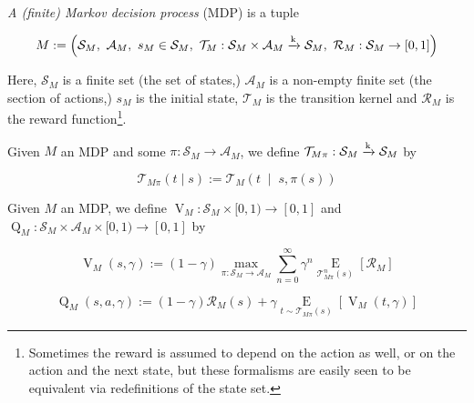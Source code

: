\documentclass[anon,12pt]{colt2018} %
\newcommand{\Comment}[1]{}
\newcommand{\AP}[1]{\left(#1\right)}
\newcommand{\AB}[1]{\left[#1\right]}
\newcommand{\APM}[2]{\left(#1\;\middle\vert\;#2\right)}
\newcommand{\Ea}[2]{\underset{#1}{\operatorname{E}}\AB{#2}}
\newcommand{\K}{\xrightarrow{\textnormal{k}}}
\newcommand{\A}{\mathcal{A}}
\newcommand{\St}{\mathcal{S}}
\newcommand{\T}{\mathcal{T}}
\newcommand{\R}{\mathcal{R}}
\newcommand{\V}{\operatorname{V}}
\newcommand{\Q}{\operatorname{Q}}
\begin{document}
\begin{samepage}
\begin{definition}

\emph{A (finite) Markov decision process} (MDP) is a tuple

$$M:=\AP{\St_M,\ \A_M,\ s_M\in \St_M,\ \T_M: \St_M \times \A_M \K \St_M,\ \R_M: \St_M \rightarrow [0,1]}$$

Here, $\St_M$ is a finite set (the set of states,) $\A_M$ is a non-empty finite set (the section of actions,) $s_M$ is the initial state, $\T_M$ is the transition kernel and $\R_M$ is the reward function\footnote{Sometimes the reward is assumed to depend on the action as well, or on the action and the next state, but these formalisms are easily seen to be equivalent via redefinitions of the state set.}.

\end{definition}
\end{samepage}

\begin{samepage}
\begin{definition}

Given $M$ an MDP and some $\pi: \St_M \rightarrow \A_M$, we define $\T_{M\pi}: \St_M \K \St_M$ by

\begin{equation}
\T_{M\pi}(t \mid s) := \T_M\APM{t}{s,\pi(s)}
\end{equation}

\Comment{That is, $\T_{M\pi}$ is the transition kernel of the Markov chain resulting from policy $\pi$ interacting with environment $M$.}

\end{definition}
\end{samepage}

\begin{samepage}
\begin{definition}
\label{def:vq}

Given $M$ an MDP, we define $\V_M : \St_M \times [0,1) \rightarrow [0,1]$ and $\Q_M: \St_M \times \A_M \times [0,1) \rightarrow [0,1]$ by

\begin{equation}
\label{eqn:def__vq__v}
\V_M(s,\gamma):=(1-\gamma) \max_{\pi: \St_M \rightarrow \A_M} \sum_{n=0}^\infty \gamma^n \Ea{\T_{M\pi}^n(s)}{\R_M}
\end{equation}

\begin{equation}
\label{eqn:def__vq__q}
\Q_M(s,a,\gamma):=(1-\gamma)\R_M(s)+\gamma\Ea{t \sim \T_{M\pi}(s)}{\V_M(t,\gamma)}
\end{equation}

\Comment{Thus, $\V_M(s,\gamma)$ is the maximal value that can be extracted from state $s$ and $\Q_M(s,a,\gamma)$ is the maximal value that can be extracted from state $s$ after performing action $a$.}

\end{definition}
\end{samepage}
\end{document}
